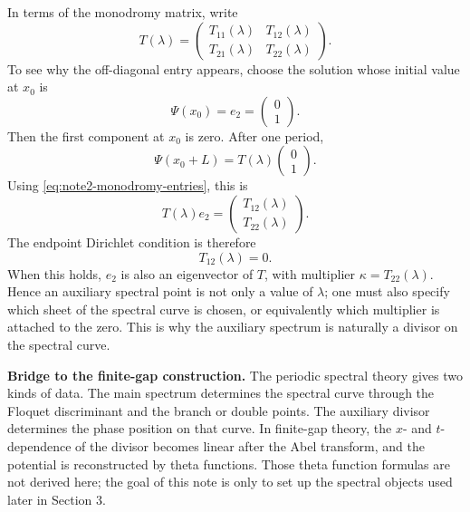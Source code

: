 \documentclass{amsart}
\newcounter{note}
\numberwithin{equation}{hw}
\newcommand{\noteheading}[1]{\vspace{1em}\noindent\textbf{#1}}
\begin{document}
In terms of the monodromy matrix, write
\begin{equation}
T(\lambda)
=
\begin{pmatrix}
T_{11}(\lambda) & T_{12}(\lambda)
\\
T_{21}(\lambda) & T_{22}(\lambda)
\end{pmatrix}.
\label{eq:note2-monodromy-entries}
\end{equation}
To see why the off-diagonal entry appears, choose the solution whose
initial value at \(x_0\) is
\begin{equation}
\Psi(x_0)
=
e_2
=
\begin{pmatrix}
0\\
1
\end{pmatrix}.
\label{eq:note2-auxiliary-initial-vector}
\end{equation}
Then the first component at \(x_0\) is zero.  After one period,
\begin{equation}
\Psi(x_0+L)
=
T(\lambda)
\begin{pmatrix}
0\\
1
\end{pmatrix}.
\label{eq:note2-auxiliary-after-period}
\end{equation}
Using \eqref{eq:note2-monodromy-entries}, this is
\begin{equation}
T(\lambda)e_2
=
\begin{pmatrix}
T_{12}(\lambda)
\\
T_{22}(\lambda)
\end{pmatrix}.
\label{eq:note2-Te2}
\end{equation}
The endpoint Dirichlet condition is therefore
\begin{equation}
T_{12}(\lambda)=0.
\label{eq:note2-T12-condition}
\end{equation}
When this holds, \(e_2\) is also an eigenvector of \(T\), with multiplier
\(\kappa=T_{22}(\lambda)\).  Hence an auxiliary spectral point is not
only a value of \(\lambda\); one must also specify which sheet of the
spectral curve is chosen, or equivalently which multiplier is attached
to the zero.  This is why the auxiliary spectrum is naturally a divisor
on the spectral curve.

\noteheading{Bridge to the finite-gap construction.}
The periodic spectral theory gives two kinds of data.  The main spectrum
determines the spectral curve through the Floquet discriminant and the
branch or double points.  The auxiliary divisor determines the phase
position on that curve.  In finite-gap theory, the \(x\)- and
\(t\)-dependence of the divisor becomes linear after the Abel transform,
and the potential is reconstructed by theta functions.  Those theta
function formulas are not derived here; the goal of this note is only to
set up the spectral objects used later in Section 3.
\end{document}
